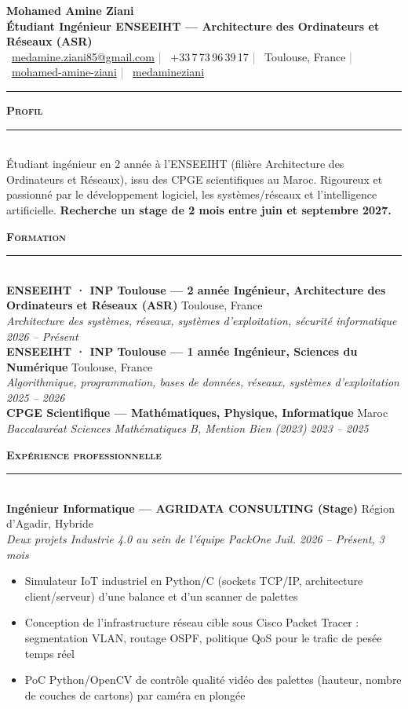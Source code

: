 \documentclass[11pt,a4paper]{article}
\newcommand{\cvsection}[1]{%
  \vspace{7pt}
  {\color{accent}\large\bfseries\scshape #1}\\[1pt]
  {\color{accent}\rule{\linewidth}{0.9pt}}\\[3pt]
}
\newcommand{\cventry}[4]{%
  \noindent\textbf{#1} \hfill {\color{graytext}\small #4}\\
  {\color{accent}\itshape #3} \hfill {\itshape\small #2}\\[2pt]
}
\begin{document}
\begin{center}
  {\fontsize{24}{26}\selectfont\bfseries Mohamed Amine Ziani}\\[3pt]
  {\large\color{accent}\bfseries Étudiant Ingénieur ENSEEIHT — Architecture des Ordinateurs et Réseaux (ASR)}\\[6pt]
  {\small
    \faEnvelope\ \href{mailto:medamine.ziani85@gmail.com}{medamine.ziani85@gmail.com}
    \quad\textcolor{graytext}{|}\quad
    \faPhone\ +33\,7\,73\,96\,39\,17
    \quad\textcolor{graytext}{|}\quad
    \faMapMarkerAlt\ Toulouse, France
    \quad\textcolor{graytext}{|}\quad
    \faLinkedin\ \href{https://www.linkedin.com/in/mohamed-amine-ziani}{mohamed-amine-ziani}
    \quad\textcolor{graytext}{|}\quad
    \faGithub\ \href{https://github.com/medamineziani}{medamineziani}
  }
\end{center}
\vspace{2pt}
{\color{accent}\rule{\linewidth}{1.1pt}}

\cvsection{Profil}
\small
Étudiant ingénieur en 2\ieme{} année à l'ENSEEIHT (filière Architecture des Ordinateurs et Réseaux), issu des CPGE scientifiques au Maroc. Rigoureux et passionné par le développement logiciel, les systèmes/réseaux et l'intelligence artificielle. \textbf{\color{accent}Recherche un stage de 2 mois entre juin et septembre 2027.}
\normalsize

\cvsection{Formation}
\small
\cventry{ENSEEIHT · INP Toulouse — 2\ieme{} année Ingénieur, Architecture des Ordinateurs et Réseaux (ASR)}{2026 -- Présent}{Architecture des systèmes, réseaux, systèmes d'exploitation, sécurité informatique}{Toulouse, France}

\cventry{ENSEEIHT · INP Toulouse — 1\iere{} année Ingénieur, Sciences du Numérique}{2025 -- 2026}{Algorithmique, programmation, bases de données, réseaux, systèmes d'exploitation}{Toulouse, France}

\cventry{CPGE Scientifique — Mathématiques, Physique, Informatique}{2023 -- 2025}{Baccalauréat Sciences Mathématiques B, Mention Bien (2023)}{Maroc}
\normalsize

\cvsection{Expérience professionnelle}
\small
\cventry{Ingénieur Informatique — AGRIDATA CONSULTING (Stage)}{Juil. 2026 -- Présent, 3 mois}{Deux projets Industrie 4.0 au sein de l'équipe PackOne}{Région d'Agadir, Hybride}
\begin{itemize}
  \item Simulateur IoT industriel en Python/C (sockets TCP/IP, architecture client/serveur) d'une balance et d'un scanner de palettes
  \item Conception de l'infrastructure réseau cible sous Cisco Packet Tracer : segmentation VLAN, routage OSPF, politique QoS pour le trafic de pesée temps réel
  \item PoC Python/OpenCV de contrôle qualité vidéo des palettes (hauteur, nombre de couches de cartons) par caméra en plongée
\end{itemize}
\end{document}
